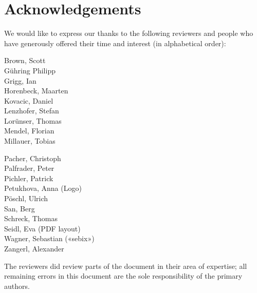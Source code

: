 \newpage
\section{Acknowledgements}
\label{section:Reviewers}



We would like to express our thanks to the following reviewers and people who have generously offered their time and interest (in alphabetical order):


\vline{}

\begin{minipage}[b]{0.5\linewidth}
\center
Brown, Scott \\
Gühring Philipp  \\
Grigg, Ian  \\
Horenbeck, Maarten \\
Kovacic, Daniel \\
Lenzhofer, Stefan \\
Lor\"unser, Thomas \\
Mendel, Florian \\
Millauer, Tobias \\
\end{minipage}
\begin{minipage}[b]{0.5\linewidth}
\center
Pacher, Christoph \\
Palfrader, Peter \\
Pichler, Patrick \\
Petukhova, Anna (Logo) \\
Pöschl, Ulrich \\
San, Berg \\
Schreck, Thomas  \\
Seidl, Eva (PDF layout) \\
Wagner, Sebastian («sebix») \\
Zangerl, Alexander \\
\end{minipage}

\vline{}

The reviewers did review parts of the document in their area of
expertise; all remaining errors in this document are the sole
responsibility of the primary authors.




